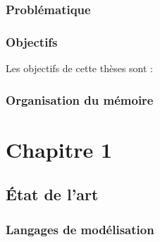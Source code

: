 \documentclass[french]{spimufcphdthesis}
\begin{document}
\section{Problématique}

\section{Objectifs}
Les objectifs de cette thèses sont :

\section{Organisation du mémoire}


\part{Chapitre 1}

\chapter{État de l'art}



\section{Langages de modélisation}
\end{document}
